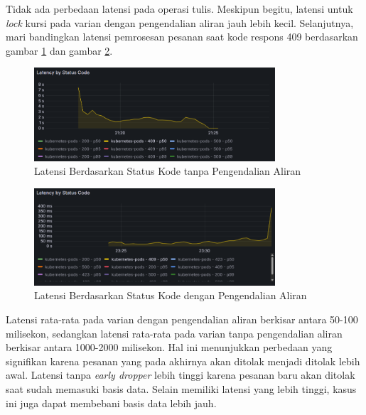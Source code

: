 Tidak ada perbedaan latensi pada operasi tulis. Meskipun begitu, latensi untuk \textit{lock} kursi pada varian dengan pengendalian aliran jauh lebih kecil. Selanjutnya, mari bandingkan latensi pemrosesan pesanan saat kode respons 409 berdasarkan gambar \ref{fig:latency-by-code-nofc} dan gambar \ref{fig:latency-by-code-fc}.

\begin{figure}[htbp]
    \centering
    \includegraphics[width=0.8\textwidth]{resources/chapter-4/latency-by-code-nofc-pg-stress-0.png}
    \caption{Latensi Berdasarkan Status Kode tanpa Pengendalian Aliran}
    \label{fig:latency-by-code-nofc}
\end{figure}

\pagebreak

\begin{figure}[htbp]
    \centering
    \includegraphics[width=0.8\textwidth]{resources/chapter-4/latency-by-code-fc-pg-stress-0.png}
    \caption{Latensi Berdasarkan Status Kode dengan Pengendalian Aliran}
    \label{fig:latency-by-code-fc}
\end{figure}

Latensi rata-rata pada varian dengan pengendalian aliran berkisar antara 50-100 milisekon, sedangkan latensi rata-rata pada varian tanpa pengendalian aliran berkisar antara 1000-2000 milisekon. Hal ini menunjukkan perbedaan yang signifikan karena pesanan yang pada akhirnya akan ditolak menjadi ditolak lebih awal. Latensi tanpa \textit{early dropper} lebih tinggi karena pesanan baru akan ditolak saat sudah memasuki basis data. Selain memiliki latensi yang lebih tinggi, kasus ini juga dapat membebani basis data lebih jauh.

